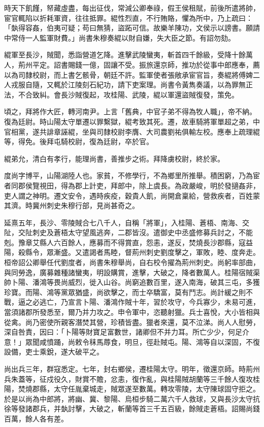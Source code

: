 \begin{pinyinscope}
時天下飢饉，帑藏虛盡，每出征伐，常減公卿奉祿，假王侯租賦，前後所遣將帥，宦官輒陷以折耗軍資，往往抵罪。緄性烈直，不行賄賂，懼為所中，乃上疏曰：「埶得容姦，伯夷可疑；苟曰無猜，盜跖可信。故樂羊陳功，文侯示以謗書。願請中常侍一人監軍財費。」尚書朱穆奏緄以財自嫌，失大臣之節。有詔勿劾。

緄軍至長沙，賊聞，悉詣營道乞降。進擊武陵蠻夷，斬首四千餘級，受降十餘萬人，荊州平定。詔書賜錢一億，固讓不受。振旅還京師，推功於從事中郎應奉，薦以為司隸校尉，而上書乞骸骨，朝廷不許。監軍使者張敞承宦官旨，奏緄將傅婢二人戎服自隨，又輒於江陵刻石紀功，請下吏案理。尚書令黃雋奏議，以為罪無正法，不合致糾。會長沙賊復起，攻桂陽、武陵，緄以軍還盜賊復發，策免。

頃之，拜將作大匠，轉河南尹。上言「舊典，中官子弟不得為牧人職」，帝不納。復為廷尉。時山陽太守單遷以罪繫獄，緄考致其死。遷，故車騎將軍單超之弟，中官相黨，遂共誹章誣緄，坐與司隸校尉李膺、大司農劉祐俱輸左校。應奉上疏理緄等，得免。後拜屯騎校尉，復為廷尉，卒於官。

緄弟允，清白有孝行，能理尚書，善推步之術。拜降虜校尉，終於家。

度尚字博平，山陽湖陸人也。家貧，不修學行，不為鄉里所推舉。積困窮，乃為宦者同郡侯覽視田，得為郡上計吏，拜郎中，除上虞長。為政嚴峻，明於發擿姦非，吏人謂之神明。遷文安令，遇時疾疫，穀貴人飢，尚開倉稟給，營救疾者，百姓蒙其濟。時冀州刺史朱穆行部，見尚甚奇之。

延熹五年，長沙、零陵賊合七八千人，自稱「將軍」，入桂陽、蒼梧、南海、交阯，交阯刺史及蒼梧太守望風逃奔，二郡皆沒。遣御史中丞盛修募兵討之，不能剋。豫章艾縣人六百餘人，應募而不得賞直，怨恚，遂反，焚燒長沙郡縣，寇益陽，殺縣令，眾漸盛。又遣謁者馬睦，督荊州刺史劉度擊之，軍敗，睦、度奔走。桓帝詔公卿舉任代劉度者，尚書朱穆舉尚，自右校令擢為荊州刺史。尚躬率部曲，與同勞逸，廣募雜種諸蠻夷，明設購賞，進擊，大破之，降者數萬人。桂陽宿賊渠帥卜陽、潘鴻等畏尚威烈，徙入山谷。尚窮追數百里，遂入南海，破其三屯，多獲珍寶。而陽、鴻等黨眾猶盛，尚欲擊之，而士卒驕富，莫有鬥志。尚計緩之則不戰，逼之必逃亡，乃宣言卜陽、潘鴻作賊十年，習於攻守，今兵寡少，未易可進，當須諸郡所發悉至，爾乃并力攻之。申令軍中，恣聽射獵。兵士喜悅，大小皆相與從禽。尚乃密使所親客潛焚其營，珍積皆盡。獵者來還，莫不泣涕。尚人人慰勞，深自咎責，因曰：「卜陽等財寶足富數世，諸卿但不并力耳。所亡少少，何足介意！」眾聞咸憤踊，尚敕令秣馬蓐食，明旦，徑赴賊屯。陽、鴻等自以深固，不復設備，吏士乘銳，遂大破平之。

尚出兵三年，群寇悉定。七年，封右鄉侯，遷桂陽太守。明年，徵還京師。時荊州兵朱蓋等，征戍役久，財賞不贍，忿恚，復作亂，與桂陽賊胡蘭等三千餘人復攻桂陽，焚燒郡縣，太守任胤棄城走，賊眾遂至數萬。轉攻零陵，太守陳球固守拒之。於是以尚為中郎將，將幽、冀、黎陽、烏桓步騎二萬六千人救球，又與長沙太守抗徐等發諸郡兵，并埶討擊，大破之，斬蘭等首三千五百級，餘賊走蒼梧。詔賜尚錢百萬，餘人各有差。


\end{pinyinscope}
